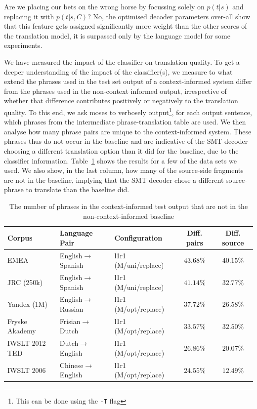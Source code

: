 \documentclass[smallextended]{svjour3}       %
\theoremstyle{break}
\begin{document}
Are we placing our bets on the wrong horse by focussing solely on $p(t|s)$ and
replacing it with $p(t|s,C)$? No, the optimised decoder parameters over-all
show that this feature gets assigned significantly more weight than the other
scores of the translation model, it is surpassed only by the language model for
some experiments.

We have measured the impact of the classifier on translation quality. To get a
deeper understanding of the impact of the classifier(s), we measure to what
extend the phrases used in the test set output of a context-informed system
differ from the phrases used in the non-context informed output, irrespective
of whether that difference contributes positively or negatively to the
translation quality. To this end, we ask moses to verbosely
output\footnote{This can be done using the \texttt{-T} flag}, for each output
sentence, which phrases from the intermediate phrase-translation table are
used. We then analyse how many phrase pairs are unique to the context-informed
system. These phrases thus do not occur in the baseline and are indicative of
the SMT decoder choosing a different translation option than it did for the
baseline, due to the classifier information. Table~\ref{tab:decodediff} shows
the results for a few of the data sets we used. We also show, in the last
column, how many of the source-side fragments are not in the baseline, implying
that the SMT decoder chose a different source-phrase to translate than the
baseline did.

\begin{table}
\begin{center}
\begin{tabular}{|lll|cc|}
\hline
\textbf{Corpus} & \textbf{Language Pair} & \textbf{Configuration} &
\textbf{Diff. pairs} & \textbf{Diff. source} \\
\hline
EMEA & English$\rightarrow$Spanish & l1r1 (M/uni/replace) & $43.68\%$ & $40.15\%$ \\
JRC (250k) & English$\rightarrow$Spanish & l1r1 (M/uni/replace) & $41.14\%$ & $32.77\%$ \\
Yandex (1M) & English$\rightarrow$Russian & l1r1 (M/opt/replace) & $37.72\%$ & $26.58\%$ \\
Fryske Akademy & Frisian$\rightarrow$Dutch & l1r1 (M/opt/replace) & $33.57\%$ & $32.50\%$ \\
IWSLT 2012 TED & Dutch$\rightarrow$English & l1r1 (M/opt/replace) & $26.86\%$ & $20.07\%$ \\
IWSLT 2006 & Chinese$\rightarrow$English & l1r1 (M/opt/replace) & $24.55\%$ & $12.49\%$ \\
\hline
\end{tabular}
\caption{The number of phrases in the context-informed test output that are not
in the non-context-informed baseline}
\label{tab:decodediff}
\end{center}
\end{table}
\end{document}
